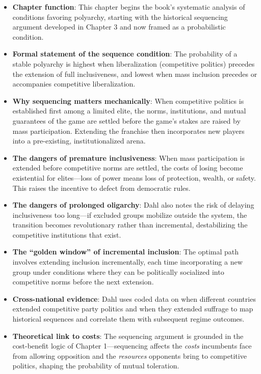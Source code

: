 \documentclass[12pt]{article}
\begin{document}
\begin{itemize}[leftmargin=*, itemsep=4pt]
    \item \textbf{Chapter function}: This chapter begins the book's systematic analysis of conditions favoring polyarchy, starting with the historical sequencing argument developed in Chapter 3 and now framed as a probabilistic condition.
    \item \textbf{Formal statement of the sequence condition}: The probability of a stable polyarchy is highest when liberalization (competitive politics) precedes the extension of full inclusiveness, and lowest when mass inclusion precedes or accompanies competitive liberalization.
    \item \textbf{Why sequencing matters mechanically}: When competitive politics is established first among a limited elite, the norms, institutions, and mutual guarantees of the game are settled before the game's stakes are raised by mass participation. Extending the franchise then incorporates new players into a pre-existing, institutionalized arena.
    \item \textbf{The dangers of premature inclusiveness}: When mass participation is extended before competitive norms are settled, the costs of losing become existential for elites---loss of power means loss of protection, wealth, or safety. This raises the incentive to defect from democratic rules.
    \item \textbf{The dangers of prolonged oligarchy}: Dahl also notes the risk of delaying inclusiveness too long---if excluded groups mobilize outside the system, the transition becomes revolutionary rather than incremental, destabilizing the competitive institutions that exist.
    \item \textbf{The ``golden window'' of incremental inclusion}: The optimal path involves extending inclusion incrementally, each time incorporating a new group under conditions where they can be politically socialized into competitive norms before the next extension.
    \item \textbf{Cross-national evidence}: Dahl uses coded data on when different countries extended competitive party politics and when they extended suffrage to map historical sequences and correlate them with subsequent regime outcomes.
    \item \textbf{Theoretical link to costs}: The sequencing argument is grounded in the cost-benefit logic of Chapter 1---sequencing affects the \emph{costs} incumbents face from allowing opposition and the \emph{resources} opponents bring to competitive politics, shaping the probability of mutual toleration.
\end{itemize}
\end{document}
